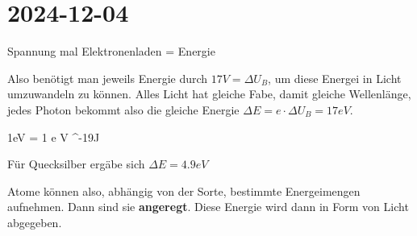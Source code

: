 \section{2024-12-04}

Spannung mal Elektronenladen = Energie

Also benötigt man jeweils Energie durch $17 V = \Delta U_B$, um diese Energei
in Licht umzuwandeln zu können. Alles Licht hat gleiche Fabe, damit gleiche
Wellenlänge, jedes Photon bekommt also die gleiche Energie $\Delta E = e\cdot
\Delta U_B = 17 eV$.

\startformula
1eV = 1 e  V  ^{-19}J
\stopformula

Für Quecksilber ergäbe sich $\Delta E = 4.9eV$

Atome können also, abhängig von der Sorte, bestimmte Energeimengen aufnehmen. Dann sind sie {\bf angeregt}. Diese Energie wird dann in Form von Licht abgegeben. 
